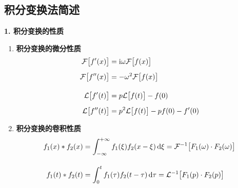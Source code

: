 \subsection{积分变换法简述}
\noindent \textbf{1. 积分变换的性质}
\begin{enumerate}
	\item \textbf{积分变换的微分性质}
	\begin{align}
		\mathcal{F}\big[f'(x)\big] &=  {\rm{i}} \omega \mathcal{F}\big[f(x)\big] \\[0.5em]
		\mathcal{F}\big[f''(x)\big] &=  -\omega^2 \mathcal{F}\big[f(x)\big] \\[1em]
		\mathcal{L}\big[f'(t)\big] & = p \mathcal{L}\big[f(t)\big] - f(0)\\[0.5em]
		\mathcal{L}\big[f''(t)\big] & = p^2\mathcal{L}\big[f(t)\big] - pf(0) - f'(0)
	\end{align}
	
	\item \textbf{积分变换的卷积性质}
	\begin{align}
		f_1(x) * f_2(x) &= \int_{-\infty}^{+\infty} f_1(\xi)f_2(x - \xi) \, {\rm{d}} \xi  = \mathcal{F}^{-1}\big[F_1(\omega)\cdot F_2(\omega)\big]\\[1em]
		f_1(t) * f_2(t) &= \int_{0}^{t} f_1(\tau)f_2(t - \tau) \, {\rm{d}} \tau = \mathcal{L}^{-1}\big[F_1(p)\cdot F_2(p)\big]
	\end{align}
\end{enumerate}


